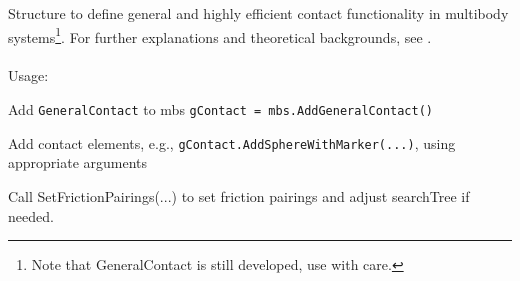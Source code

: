 \label{sec:GeneralContact}Structure to define general and highly efficient contact functionality in multibody systems\footnote{Note that GeneralContact is still developed, use with care.}. For further explanations and theoretical backgrounds, see . \\ \\ Usage: \bi
  \item Add \texttt{GeneralContact} to mbs \texttt{gContact = mbs.AddGeneralContact()} 
  \item Add contact elements, e.g., \texttt{gContact.AddSphereWithMarker(...)}, using appropriate arguments 
  \item Call SetFrictionPairings(...) to set friction pairings and adjust searchTree if needed.
\ei



